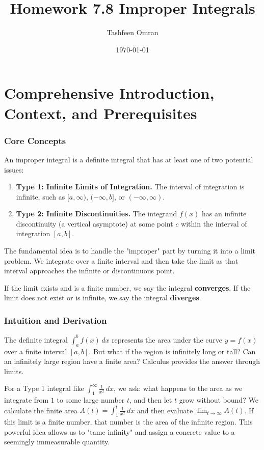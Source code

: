 \documentclass{article}
\title{Homework 7.8 Improper Integrals}
\author{Tashfeen Omran}
\date{\today}
\begin{document}
\maketitle

\part{Comprehensive Introduction, Context, and Prerequisites}

\section{Core Concepts}
An improper integral is a definite integral that has at least one of two potential issues:
\begin{enumerate}
    \item \textbf{Type 1: Infinite Limits of Integration.} The interval of integration is infinite, such as $[a, \infty)$, $(-\infty, b]$, or $(-\infty, \infty)$.
    \item \textbf{Type 2: Infinite Discontinuities.} The integrand $f(x)$ has an infinite discontinuity (a vertical asymptote) at some point $c$ within the interval of integration $[a, b]$.
\end{enumerate}
The fundamental idea is to handle the "improper" part by turning it into a limit problem. We integrate over a finite interval and then take the limit as that interval approaches the infinite or discontinuous point.

If the limit exists and is a finite number, we say the integral \textbf{converges}. If the limit does not exist or is infinite, we say the integral \textbf{diverges}.

\section{Intuition and Derivation}
The definite integral $\int_{a}^{b} f(x) \,dx$ represents the area under the curve $y=f(x)$ over a finite interval $[a, b]$. But what if the region is infinitely long or tall? Can an infinitely large region have a finite area? Calculus provides the answer through limits.

For a Type 1 integral like $\int_{1}^{\infty} \frac{1}{x^2} \,dx$, we ask: what happens to the area as we integrate from $1$ to some large number $t$, and then let $t$ grow without bound? We calculate the finite area $A(t) = \int_{1}^{t} \frac{1}{x^2} \,dx$ and then evaluate $\lim_{t \to \infty} A(t)$. If this limit is a finite number, that number is the area of the infinite region. This powerful idea allows us to "tame infinity" and assign a concrete value to a seemingly immeasurable quantity.
\end{document}
